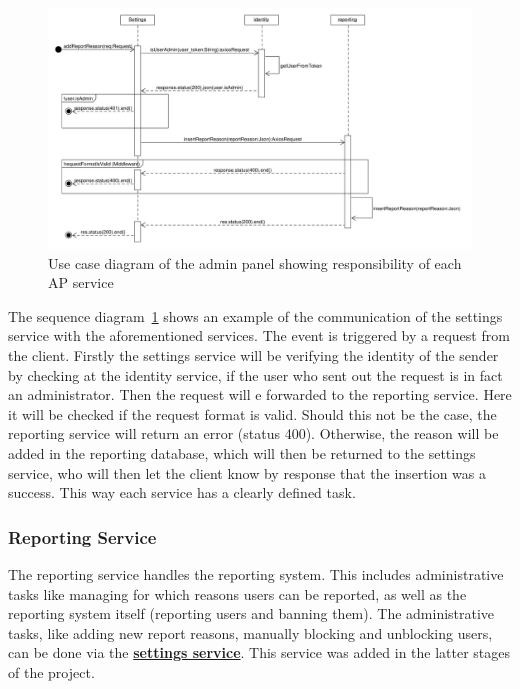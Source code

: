 \begin{figure}[!ht]
    \centering
    \includegraphics[width=1.0\textwidth]{./images/SequenceDiagram_AddReportReason}
    \caption{Use case diagram of the admin panel showing responsibility of each AP service}
    \label{fig:addReportReason}
\end{figure}

The sequence diagram~\ref{fig:addReportReason} shows an example of the communication of the settings service with the
aforementioned services.
The event is triggered by a request from the client.
Firstly the settings service will be verifying the identity of the sender by checking at the identity service, if the
user who sent out the request is in fact an administrator.
Then the request will e forwarded to the reporting service.
Here it will be checked if the request format is valid.
Should this not be the case, the reporting service will return an error (status 400).
Otherwise, the reason will be added in the reporting database, which will then be returned to the settings service,
who will then let the client know by response that the insertion was a success.
This way each service has a clearly defined task.

\subsubsection{Reporting Service}\label{subsubsec:reportingSer}

The reporting service handles the reporting system.
This includes administrative tasks like managing for which reasons users can be reported, as well as the reporting
system itself (reporting users and banning them).
The administrative tasks, like adding new report reasons, manually blocking and unblocking users, can be done via the
\hyperref[subsubsec:settingsSer]{\textbf{settings service}}.
This service was added in the latter stages of the project.

